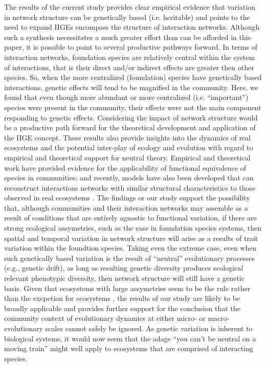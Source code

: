 \documentclass[11pt,twocolumn,twoside,lineno]{pnas-new}
\begin{document}
The results of the current study provides clear empirical evidence
that variation in network structure can be genetically based
(i.e. heritable) and points to the need to expand IIGEs encompass the
structure of interaction networks. Although such a synthesis
necessitates a much greater effort than can be afforded in this paper,
it is possible to point to several productive pathways forward. In
terms of interaction networks, foundation species are relatively
central within the system of interactions, that is their direct and/or
indirect effects are greater then other species. So, when the more
centralized (foundation) species have genetically based interactions,
genetic effects will tend to be magnified in the community. Here, we
found that even though more abundant or more centralized
(i.e. ``important'') species were present in the community, their
effects were not the main component responding to genetic
effects. Considering the impact of network structure would be a
productive path forward for the theoretical development and
application of the IIGE concept. These results also provide insights
into the dynamics of real ecosystems and the potential inter-play of
ecology and evolution with regard to empirical and theoretical support
for neutral theory. Empirical \cite{Hubbel} and theoretical work
\cite{Refeldt} have provided evidence for the applicability of
functional equivalence of species in communities; and recently, models
have also been developed that can reconstruct interactions networks
with similar structural characteristics to those observed in real
ecosystems \cite{Coelho2018}. The findings or our study support the
possibility that, although communities and their interaction networks
may assemble as a result of conditions that are entirely agnostic to
functional variation, if there are strong ecological assymetries, such
as the case in foundation species systems, then spatial and temporal
variation in network structure will arise as a results of trait
variation within the foundtion species. Taking even the extreme case,
even when such genetically based variation is the result of
``neutral'' evolutionary processes (e.g., genetic drift), as long as
resulting genetic diversity produces ecological relevant phenotypic
diversity, then network structure will still have a genetic
basis. Given that ecosystems with large assymetries seem to be the
rule rather than the excpetion for ecosystems \cite{Ellison2005,
  Santamara2007, Vasquez2009, Staniczenko2013, Dormman2017,
  Coehlo2018}, the results of our study are likely to be broadly
applicable and provides further support for the conclusion that the
community context of evolutionary dynamics at either micro- or
macro-evolutionary scales \cite{Weber2017, Harmon2019} cannot safely
be ignored. As genetic variation is inherent to biological systems, it
would now seem that the adage ``you can't be neutral on a moving
train'' might well apply to ecosystems that are comprised of
interacting species.
\end{document}
